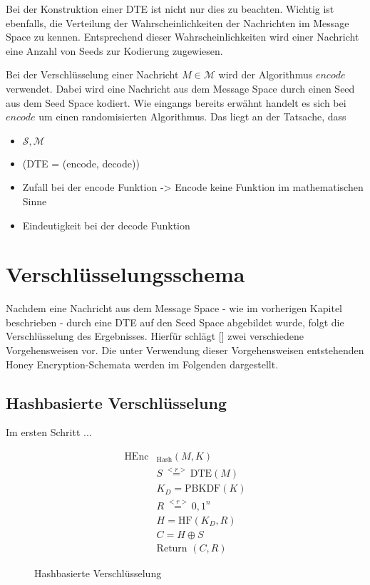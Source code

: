 \documentclass[12pt]{scrartcl}
\begin{document}
Bei der Konstruktion einer DTE ist nicht nur dies zu beachten. Wichtig ist ebenfalls, die Verteilung der Wahrscheinlichkeiten der Nachrichten im Message Space zu kennen. Entsprechend dieser Wahrscheinlichkeiten wird einer Nachricht eine Anzahl von Seeds zur Kodierung zugewiesen.

Bei der Verschlüsselung einer Nachricht $M \in \mathcal{M}$ wird der Algorithmus $encode$ verwendet. Dabei wird eine Nachricht aus dem Message Space durch einen Seed aus dem Seed Space kodiert. Wie eingangs bereits erwähnt handelt es sich bei $encode$ um einen randomisierten Algorithmus. Das liegt an der Tatsache, dass 








\begin{itemize}
\item $\mathcal{S}, \mathcal{M}$
\item (DTE = (encode, decode))
\item Zufall bei der encode Funktion -> Encode keine Funktion im mathematischen Sinne
\item Eindeutigkeit bei der decode Funktion
\end{itemize}

\newpage
\section{Verschlüsselungsschema}
\label{sec:schema}
Nachdem eine Nachricht aus dem Message Space - wie im vorherigen Kapitel beschrieben - durch eine DTE auf den Seed Space abgebildet wurde, folgt die Verschlüsselung des Ergebnisses. Hierfür schlägt [\cite{EURO2014}] zwei verschiedene Vorgehensweisen vor. Die unter Verwendung dieser Vorgehensweisen entstehenden Honey Encryption-Schemata werden im Folgenden dargestellt.

\subsection{Hashbasierte Verschlüsselung}

Im ersten Schritt ...

\begin{figure}[h]
	\begin{align*}
		\text{HEnc}&_{\text{Hash}}(M, K)\\
		&S \overset{<r>}{=} \text{DTE}(M)\\ 	%
		&K_D = \text{PBKDF}(K)\\ 		%
		&R \overset{<r>}{=} {0,1}^n\\	%
		&H = \text{HF}(K_D,R)\\	%
		&C = H \oplus S\\	%
		&\text{Return } (C,R)
	\end{align*}
	\caption{Hashbasierte Verschlüsselung}
	\label{fig:HashEnc}
\end{figure}
\end{document}
